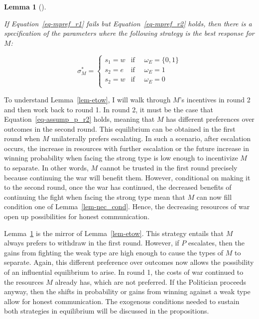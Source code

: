 \documentclass[
  12pt,
]{article}
\theoremstyle{plain}
\newtheorem{lemma}{Lemma}[section]
\theoremstyle{plain}
\theoremstyle{remark}
\begin{document}
\begin{lemma}[]\protect\hypertarget{lem-wtoe}{}\label{lem-wtoe}

If Equation~\ref{eq-mpref_r1} fails but Equation~\ref{eq-mpref_r2}
holds, then there is a specification of the parameters where the
following strategy is the best response for \(M\):

\[
\sigma^{*}_M = 
\begin{cases}
s_1 = w  & \text{if } \quad \omega_E = \{0, 1\}\\
s_2 = e  & \text{if } \quad \omega_E = 1\\
s_2 = w  & \text{if } \quad \omega_E = 0\\
\end{cases}
\]

\end{lemma}

To understand Lemma~\ref{lem-etow}, I will walk through \(M\)'s
incentives in round 2 and then work back to round 1. In round 2, it must
be the case that Equation~\ref{eq-assump_p_r2} holds, meaning that \(M\)
has different preferences over outcomes in the second round. This
equilibrium can be obtained in the first round when \(M\) unilaterally
prefers escalating. In such a scenario, after escalation occurs, the
increase in resources with further escalation or the future increase in
winning probability when facing the strong type is low enough to
incentivize \(M\) to separate. In other words, \(M\) cannot be trusted
in the first round precisely because continuing the war will benefit
them. However, conditional on making it to the second round, once the
war has continued, the decreased benefits of continuing the fight when
facing the strong type mean that \(M\) can now fill condition one of
Lemma~\ref{lem-nec_cond}. Hence, the decreasing resources of war open up
possibilities for honest communication.

Lemma~\ref{lem-wtoe} is the mirror of Lemma~\ref{lem-etow}. This
strategy entails that \(M\) always prefers to withdraw in the first
round. However, if \(P\) escalates, then the gains from fighting the
weak type are high enough to cause the types of \(M\) to separate.
Again, this different preference over outcomes now allows the
possibility of an influential equilibrium to arise. In round 1, the
costs of war continued to the resources \(M\) already has, which are not
preferred. If the Politician proceeds anyway, then the shifts in
probability or gains from winning against a weak type allow for honest
communication. The exogenous conditions needed to sustain both
strategies in equilibrium will be discussed in the propositions.
\end{document}
